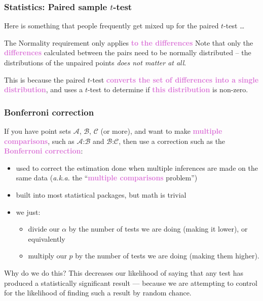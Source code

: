 \documentclass{beamer}
\newcommand{\aka}{\textit{a.k.a.}\xspace}
\newcommand{\key}[1]{\textcolor{orchid}{{\bf #1}}}
\begin{document}
\begin{frame}
\frametitle{Statistics: Paired sample $t$-test}\label{caveat:pairs}
Here is something that people frequently get mixed up for
the paired $t$-test \dots

\begin{block}{The Normality requirement only applies \key{to the differences}}
Note that only the \key{differences} calculated between the pairs
need to be normally distributed -- the distributions of the
unpaired points \emph{does not matter at all}.

This is because the paired $t$-test \key{converts the set of differences
into a single distribution}, and uses a $t$-test to determine if \key{this
distribution} is non-zero.
\end{block}
\end{frame}

\begin{frame}
\frametitle{Bonferroni correction}
If you have point sets
$\mathcal{A}$,
$\mathcal{B}$,
$\mathcal{C}$ (or more),
and want to make \key{multiple comparisons}, such as
$\mathcal{A}$:$\mathcal{B}$ and
$\mathcal{B}$:$\mathcal{C}$, then
use a correction such as the \key{Bonferroni correction}:
\begin{itemize}
\item used to correct the estimation done when multiple inferences
		are made on the same data (\aka the ``\key{multiple comparisons} problem'')
\pause
\item built into most statistical packages, but math is trivial
\item we just:
	\begin{itemize}
	\item divide our $\alpha$ by the number of tests we are doing (making it lower), or equivalently
	\pause
	\item multiply our $p$ by the number of tests we are doing (making them higher).
	\end{itemize}
\end{itemize}
\pause
\begin{block}{Why do we do this?}
This decreases our likelihood of saying that any test has produced
		a statistically significant result --- because we are attempting
		to control for the likelihood of finding such a result by
		random chance.
\end{block}
\end{frame}
\end{document}
